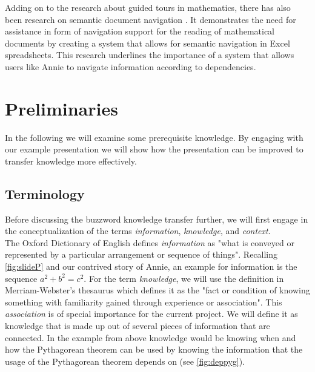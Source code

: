 \documentclass[twoside, 12pt]{article}
\begin{document}
Adding on to the research about guided tours in mathematics, there has also been research on semantic document navigation \cite{Koh:NavigationInMathDocs2012}. It demonstrates the need for assistance in form of navigation support for the reading of mathematical documents by creating a system that allows for semantic navigation in Excel spreadsheets. This research underlines the importance of a system that allows users like Annie to navigate information according to dependencies.\\
  
\section{Preliminaries}
\label{sec:preliminaries}

In the following we will examine some prerequisite knowledge. By engaging with our example presentation we will show how the presentation can be improved to transfer knowledge more effectively.\\

\subsection{Terminology}
\label{sec:terminology}

Before discussing the buzzword knowledge transfer further, we will first engage in the conceptualization of the terms \textit{information}, \textit{knowledge}, and \textit{context}.\\

The Oxford Dictionary of English \cite{OED:npentrel14} defines \textit{information} as "what is conveyed or represented by a particular arrangement or sequence of things". Recalling \autoref{fig:slideP} and our contrived story of Annie, an example for information is the sequence \textit{$a^2 + b^2 = c^2$}. For the term \textit{knowledge}, we will use the definition in Merriam-Webster's thesaurus \cite{Webster:npentrel14} which defines it as the "fact or condition of knowing something with familiarity gained through experience or association". This \textit{association} is of special importance for the current project. We will define it as knowledge that is made up out of several pieces of information that are connected. In the example from above knowledge would be knowing when and how the Pythagorean theorem can be used by knowing the information that the usage of the Pythagorean theorem depends on (see \autoref{fig:deppyg}).\\ 
\end{document}
